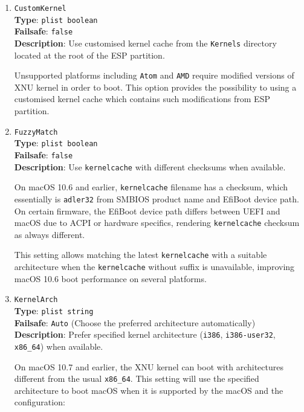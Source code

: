 \documentclass[]{article}
\begin{document}
\begin{enumerate}
\item
  \texttt{CustomKernel}\\
  \textbf{Type}: \texttt{plist\ boolean}\\
  \textbf{Failsafe}: \texttt{false}\\
  \textbf{Description}: Use customised kernel cache from the \texttt{Kernels}
  directory located at the root of the ESP partition.

  Unsupported platforms including \texttt{Atom} and \texttt{AMD} require modified versions
  of XNU kernel in order to boot. This option provides the possibility to using a customised
  kernel cache which contains such modifications from ESP partition.

\item
  \texttt{FuzzyMatch}\\
  \textbf{Type}: \texttt{plist\ boolean}\\
  \textbf{Failsafe}: \texttt{false}\\
  \textbf{Description}: Use \texttt{kernelcache} with different checksums when available.

  On macOS 10.6 and earlier, \texttt{kernelcache} filename has a checksum, which essentially
  is \texttt{adler32} from SMBIOS product name and EfiBoot device path. On certain firmware,
  the EfiBoot device path differs between UEFI and macOS due to ACPI or hardware specifics,
  rendering \texttt{kernelcache} checksum as always different.

  This setting allows matching the latest \texttt{kernelcache} with a suitable architecture
  when the \texttt{kernelcache} without suffix is unavailable, improving macOS 10.6 boot
  performance on several platforms.

\item
  \texttt{KernelArch}\\
  \textbf{Type}: \texttt{plist\ string}\\
  \textbf{Failsafe}: \texttt{Auto} (Choose the preferred architecture automatically)\\
  \textbf{Description}: Prefer specified kernel architecture (\texttt{i386},
  \texttt{i386-user32}, \texttt{x86\_64}) when available.

  On macOS 10.7 and earlier, the XNU kernel can boot with architectures different from
  the usual \texttt{x86\_64}. This setting will use the specified architecture to boot
  macOS when it is supported by the macOS and the configuration:


\end{enumerate}
\end{document}
